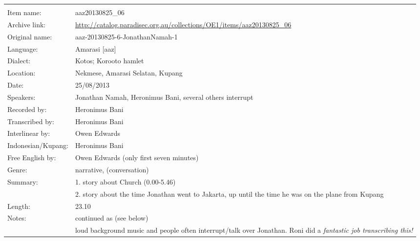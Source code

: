 \newpage
\noindent
\wg\begin{tabular}{lL{.67\textwidth}}
			& \\
Item name:			& aaz20130825{\_}06\\
Archive link:			& \url{http://catalog.paradisec.org.au/collections/OE1/items/aaz20130825_06}\\
Original name:			& aaz-20130825-6-JonathanNamah-1\\
Language:				& Amarasi [aaz] \\
Dialect:				& Kotos; Koro{\Q}oto hamlet \\
Location:				& Nekmese{\Q}, Amarasi Selatan, Kupang \\
Date:				& 25/08/2013\\
Speakers:				& Jonathan Namah, Heronimus Bani, several others interrupt \\
Recorded by:			& Heronimus Bani\\
Transcribed by:		& Heronimus Bani\\
Interlinear by:		& Owen Edwards \\
Indonesian/Kupang:		& Heronimus Bani\\
Free English by:		& Owen Edwards (only first seven minutes)\\
Genre:				& narrative, (conversation)\\
Summary:				& 1. story about Church (0.00-5.46)\\
					& 2. story about the time Jonathan went to Jakarta,
						up until the time he was on the plane from Kupang\\
Length:				& 23.10\\
Notes:				& continued as  (see below) \\
					& loud background music and people often interrupt/talk over Jonathan.
						Roni did a \it{fantastic} job transcribing this! \\
\end{tabular}

